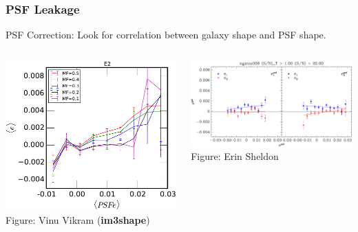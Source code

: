 \documentclass{beamer}
\newcommand{\imshape}{{\bf im3shape}}
\begin{document}
\frame
{
    \frametitle{PSF Leakage}

    PSF Correction: Look for correlation between galaxy shape and PSF shape.

    \begin{columns}
        \begin{column}{0.38\textwidth}
            \begin{center}
                \includegraphics[width=\textwidth]{im3shape-PSF-E2.pdf}
                \newline
                {\tiny Figure: Vinu Vikram (\imshape)}
            \end{center}
        \end{column}
        \begin{column}{0.62\textwidth}
            \begin{center}
            \includegraphics[width=\textwidth]{ngmix009-e-vs-epsf-Ts2n-min-1-s2n-min-20.pdf}
                \newline
                {\tiny Figure: Erin Sheldon}
            \end{center}
        \end{column}
    \end{columns}
}
\end{document}
